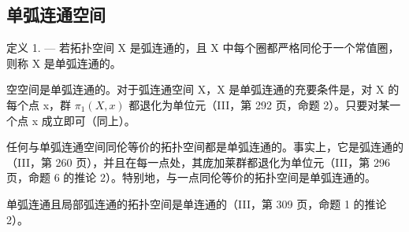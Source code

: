 \subsection{单弧连通空间}

定义 1. --- 若拓扑空间 X 是弧连通的，且 X 中每个圈都严格同伦于一个常值圈，则称 X 是单弧连通的。

空空间是单弧连通的。对于弧连通空间 X，X 是单弧连通的充要条件是，对 X 的每个点 x，群 \(\pi_{1}(X,x)\) 都退化为单位元（III，第 292 页，命题 2）。只要对某一个点 x 成立即可（同上）。

任何与单弧连通空间同伦等价的拓扑空间都是单弧连通的。事实上，它是弧连通的（III，第 260 页），并且在每一点处，其庞加莱群都退化为单位元（III，第 296 页，命题 6 的推论 2）。特别地，与一点同伦等价的拓扑空间是单弧连通的。

单弧连通且局部弧连通的拓扑空间是单连通的（III，第 309 页，命题 1 的推论 2）。
\relax{}
